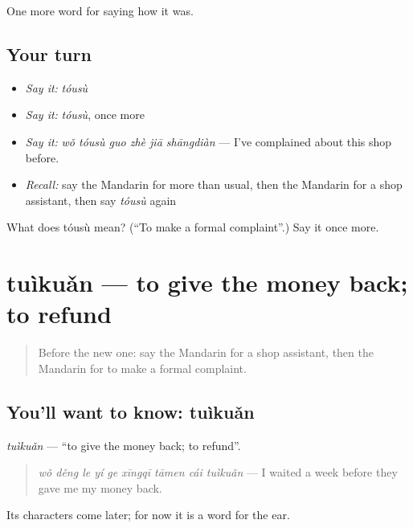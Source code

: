 \begin{grammarlens}[title={What you've built}]
One more word for saying how it was.
\end{grammarlens}

\subsection*{Your turn}
\begin{itemize}
\raggedright
  \item \emph{Say it:} \emph{tóusù}
  \item \emph{Say it:} \emph{tóusù}, once more
  \item \emph{Say it:} \emph{wǒ tóusù guo zhè jiā shāngdiàn} — I've complained about this shop before.
  \item \emph{Recall:} say the Mandarin for more than usual, then the Mandarin for a shop assistant, then say \emph{tóusù} again
\end{itemize}

\begin{tcolorbox}[breakable,colback=teal!4,colframe=teal!35!black,title={Before you move on}]
What does tóusù mean? (\textquotedblleft{}To make a formal complaint\textquotedblright{}.) Say it once more.
\end{tcolorbox}
\section[tuìkuǎn]{tuìkuǎn — to give the money back; to refund}

\label{lesson:ZH-C525-tuikuan}



\begin{quote}
Before the new one: say the Mandarin for a shop assistant, then the Mandarin for to make a formal complaint.
\end{quote}

\subsection*{You'll want to know: tuìkuǎn}
\emph{tuìkuǎn} — \textquotedblleft{}to give the money back; to refund\textquotedblright{}.

\begin{quote}
\emph{wǒ děng le yí ge xīngqī tāmen cái tuìkuǎn} — I waited a week before they gave me my money back.
\end{quote}

Its characters come later; for now it is a word for the ear.

